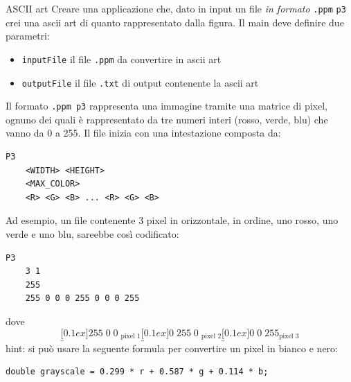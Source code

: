 \begin{esercizio}{ASCII art}
	Creare una applicazione che, dato in input un file \textit{in formato} \verb|.ppm| \verb|p3| crei una ascii art di quanto rappresentato dalla figura. Il main deve definire due parametri:
	\begin{itemize}
		\item \verb|inputFile| il file \verb|.ppm| da convertire in ascii art
		\item \verb|outputFile| il file \verb|.txt| di output contenente la ascii art
	\end{itemize}
	Il formato \verb|.ppm p3| rappresenta una immagine tramite una matrice di pixel, ognuno dei quali è rappresentato da tre numeri interi (rosso, verde, blu) che vanno da 0 a 255. Il file inizia con una intestazione composta da:
	\begin{lstlisting}[frame = none]
    P3
    <WIDTH> <HEIGHT>
    <MAX_COLOR>
    <R> <G> <B> ... <R> <G> <B>
  \end{lstlisting}
	Ad esempio, un file contenente 3 pixel in orizzontale, in ordine, uno rosso, uno verde e uno blu, sareebbe così codificato:
	\begin{lstlisting}[frame = none]
    P3
    3 1
    255
    255 0 0 0 255 0 0 0 255
  \end{lstlisting}
	dove
	\[
		\underbracket[0.1ex]{255\; 0\; 0\;}_{\text{pixel 1}} \underbracket[0.1ex]{0\; 255\; 0\;}_{\text{pixel 2}} \underbracket[0.1ex]{0\; 0\; 255}_{\text{pixel 3}}
	\]
	hint: si può usare la seguente formula per convertire un pixel in bianco e nero:
	\begin{lstlisting}[frame = none]
  double grayscale = 0.299 * r + 0.587 * g + 0.114 * b;
  \end{lstlisting}
\end{esercizio}



